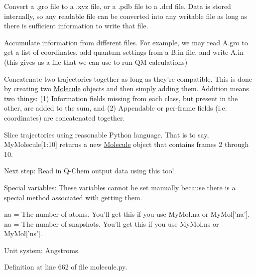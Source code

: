 \begin{DoxyItemize}
\item Convert a .gro file to a .xyz file, or a .pdb file to a .dcd file. Data is stored internally, so any readable file can be converted into any writable file as long as there is sufficient information to write that file.
\item Accumulate information from different files. For example, we may read A.\-gro to get a list of coordinates, add quantum settings from a B.\-in file, and write A.\-in (this gives us a file that we can use to run Q\-M calculations)
\item Concatenate two trajectories together as long as they're compatible. This is done by creating two \hyperlink{classforcebalance_1_1molecule_1_1Molecule}{Molecule} objects and then simply adding them. Addition means two things\-: (1) Information fields missing from each class, but present in the other, are added to the sum, and (2) Appendable or per-\/frame fields (i.\-e. coordinates) are concatenated together.
\item Slice trajectories using reasonable Python language. That is to say, My\-Molecule\mbox{[}1\-:10\mbox{]} returns a new \hyperlink{classforcebalance_1_1molecule_1_1Molecule}{Molecule} object that contains frames 2 through 10.
\end{DoxyItemize}

Next step\-: Read in Q-\/\-Chem output data using this too!

Special variables\-: These variables cannot be set manually because there is a special method associated with getting them.

na = The number of atoms. You'll get this if you use My\-Mol.\-na or My\-Mol\mbox{[}'na'\mbox{]}. na = The number of snapshots. You'll get this if you use My\-Mol.\-ns or My\-Mol\mbox{[}'ns'\mbox{]}.

Unit system\-: Angstroms. 

Definition at line 662 of file molecule.\-py.




